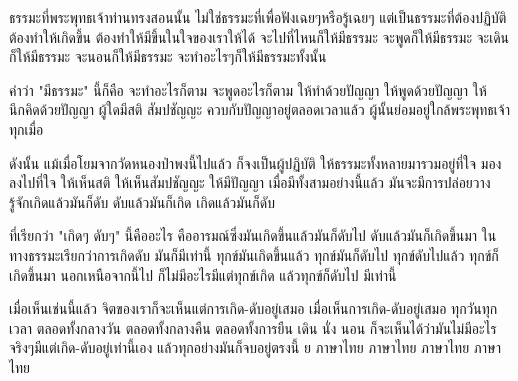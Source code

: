 \documentclass{article}
\begin{document}
\begin{multicols}{2}
{ธรรมะที่พระพุทธเจ้าท่านทรงสอนนั้น ไม่ใช่ธรรมะที่เพื่อฟังเฉยๆหรือรู้เฉยๆ แต่เป็นธรรมะที่ต้องปฏิบัติ ต้องทำให้เกิดขึ้น ต้องทำให้มีขึ้นในใจของเราให้ได้ จะไปที่ไหนก็ให้มีธรรมะ จะพูดก็ให้มีธรรมะ จะเดินก็ให้มีธรรมะ จะนอนก็ให้มีธรรมะ จะทำอะไรๆก็ให้มีธรรมะทั้งนั้น

คำว่า "มีธรรมะ" นี้ก็คือ จะทำอะไรก็ตาม จะพูดอะไรก็ตาม ให้ทำด้วยปัญญา ให้พูดด้วยปัญญา ให้นึกคิดด้วยปัญญา ผู้ใดมีสติ สัมปชัญญะ ควบกับปัญญาอยู่ตลอดเวลาแล้ว ผู้นั้นย่อมอยู่ใกล้พระพุทธเจ้าทุกเมื่อ

ดังนั้น แม้เมื่อโยมจากวัดหนองป่าพงนี้ไปแล้ว ก็จงเป็นผู้ปฏิบัติ ให้ธรรมะทั้งหลายมารวมอยู่ที่ใจ มองลงไปที่ใจ ให้เห็นสติ ให้เห็นสัมปชัญญะ ให้มีปัญญา เมื่อมีทั้งสามอย่างนี้แล้ว มันจะมีการปล่อยวาง รู้จักเกิดแล้วมันก็ดับ ดับแล้วมันก็เกิด เกิดแล้วมันก็ดับ

ที่เรียกว่า "เกิดๆ ดับๆ" นี้คืออะไร คืออารมณ์ซึ่งมันเกิดขึ้นแล้วมันก็ดับไป ดับแล้วมันก็เกิดขึ้นมา ในทางธรรมะเรียกว่าการเกิดดับ มันก็มีเท่านี้ ทุกข์มันเกิดขึ้นแล้ว ทุกข์มันก็ดับไป ทุกข์ดับไปแล้ว ทุกข์ก็เกิดขึ้นมา นอกเหนือจากนี้ไป ก็ไม่มีอะไรมีแต่ทุกข์เกิด แล้วทุกข์ก็ดับไป มีเท่านี้

เมื่อเห็นเช่นนี้แล้ว จิตของเราก็จะเห็นแต่การเกิด-ดับอยู่เสมอ เมื่อเห็นการเกิด-ดับอยู่เสมอ ทุกวันทุกเวลา ตลอดทั้งกลางวัน ตลอดทั้งกลางคืน ตลอดทั้งการยืน เดิน นั่ง นอน ก็จะเห็นได้ว่ามันไม่มีอะไรจริงๆมีแต่เกิด-ดับอยู่เท่านี้เอง แล้วทุกอย่างมันก็จบอยู่ตรงนี้ ย ภาษาไทย ภาษาไทย ภาษาไทย ภาษาไทย 
}

\end{multicols}
\end{document}
